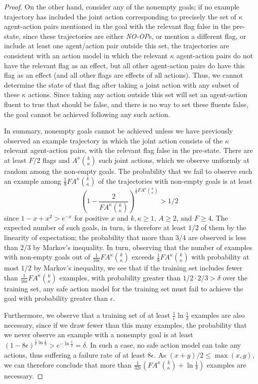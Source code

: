 \documentclass[letterpaper]{article} %
\theoremstyle{definition}
\theoremstyle{remark}
\newcommand{\noop}{\textit{NO-OP}\xspace}
\begin{document}
\begin{proof}
On the other hand, consider any of the nonempty goals; if no example trajectory has included the joint action corresponding to precisely the set of $\kappa$ agent-action pairs mentioned in the goal with the relevant flag false in the pre-state, since these trajectories are either {\noop}s, or mention a different flag, or include at least one agent/action pair outside this set, the trajectories are consistent with an action model in which the relevant $\kappa$ agent-action pairs do not have the relevant flag as an effect, but all other agent-action pairs do have this flag as an effect (and all other flags are effects of all actions). Thus, we cannot determine the state of that flag after taking a joint action with any subset of these $\kappa$ actions. Since taking any action outside this set will set an agent-action fluent to true that should be false, and there is no way to set these fluents false, the goal cannot be achieved following any such action.

In summary, nonempty goals cannot be achieved unless we have previously observed an example trajectory in which the joint action consists of the $\kappa$ relevant agent-action pairs, with the relevant flag false in the pre-state. There are at least $F/2$ flags and $A^\kappa{k\choose \kappa}$ such joint actions, which we observe uniformly at random among the non-empty goals. The probability that we fail to observe such an example among $\frac{1}{8}FA^\kappa{k\choose \kappa}$ of the trajectories with non-empty goals is at least
\[
\left(1-\frac{2}{FA^\kappa{k\choose \kappa}}\right)^{\frac{1}{8}FA^\kappa{k\choose \kappa}}> 1/2
\]
since $1-x+x^2>e^{-x}$ for positive $x$ and $k,\kappa\geq 1$, $A\geq 2$, and $F\geq 4$. The expected number of such goals, in turn, is therefore at least $1/2$ of them by the linearity of expectation; the probability that more than $3/4$ are observed is less than $2/3$ by Markov's inequality. In turn, observing that the number of examples with non-empty goals out of $\frac{1}{16\epsilon}FA^{\kappa}{k\choose\kappa}$ exceeds $\frac{1}{8}FA^\kappa{k\choose \kappa}$ with probability at most $1/2$ by Markov's inequality, we see that if the training set includes fewer than $\frac{1}{16\epsilon}FA^{\kappa}{k\choose\kappa}$ examples, with probability greater than $1/2\cdot 2/3>\delta$ over the training set, any safe action model for the training set must fail to achieve the goal with probability greater than $\epsilon$. 

Furthermore, we observe that a training set of at least $\frac{1}{\epsilon}\ln\frac{1}{\delta}$ examples are also necessary, since if we draw fewer than this many examples, the probability that we never observe an example with a nonempty goal is at least $(1-8\epsilon)^{\frac{1}{\epsilon}\ln\frac{1}{\delta}}>e^{-\ln\frac{1}{\delta}}=\delta$. In such a case, no safe action model can take any actions, thus suffering a failure rate of at least $8\epsilon$. As $(x+y)/2\leq\max(x,y)$, we can therefore conclude that more than $\frac{1}{32\epsilon}(FA^{\kappa}{k\choose\kappa}+\ln\frac{1}{\delta})$ examples are necessary.
\end{proof}
\end{document}
